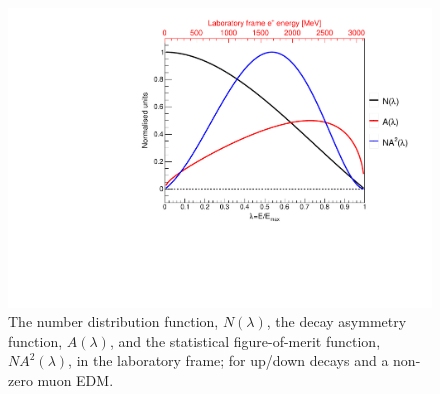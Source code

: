 \begin{figure}[t!]
\centering{}
\includegraphics[trim={0 0 0 0},clip,width=.69\textwidth]{Images/Chapter2/Asymmetry_EDM_labFrame.pdf}
\caption{The number distribution function, $N(\lambda)$, the decay asymmetry function, $A(\lambda)$, and the statistical figure-of-merit function, $NA^{2}(\lambda)$, in the laboratory frame; for up/down decays and a non-zero muon EDM.}
\label{fig:Asymmetry_EDM}
\end{figure}

